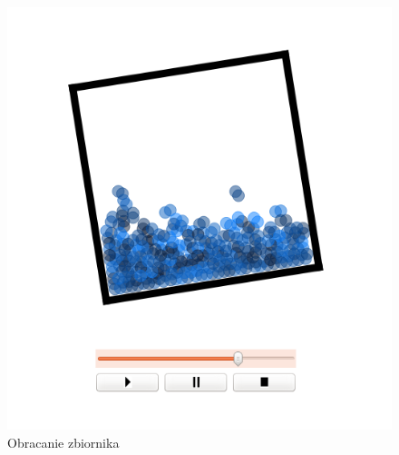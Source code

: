 \begin{minipage}{0.5\textwidth}
\begin{figure}[H]
 \begin{center}
  \includegraphics[width=\textwidth]{./rysunki/obrot_niestabilny}
 \end{center}
 \caption{Obracanie zbiornika}
 \label{fig:obrot_niestabilny}
\end{figure}
\end{minipage}
~
